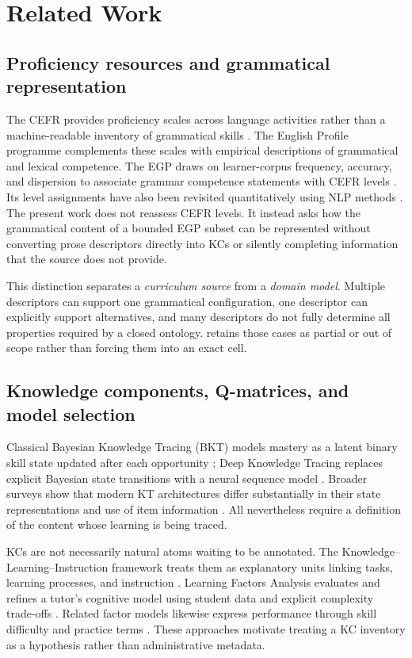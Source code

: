 \section{Related Work}

\subsection{Proficiency resources and grammatical representation}

The CEFR provides proficiency scales across language activities rather than a
machine-readable inventory of grammatical skills \citep{coe-2020-cefr}.  The
English Profile programme complements these scales with empirical descriptions
of grammatical and lexical competence.  The EGP draws on learner-corpus
frequency, accuracy, and dispersion to associate grammar competence statements
with CEFR levels \citep{okeeffe-mark-2017}.  Its level assignments have also
been revisited quantitatively using NLP methods
\citep{verratti-souto-etal-2025}.  The present work does not reassess CEFR
levels.  It instead asks how the grammatical content of a bounded EGP subset
can be represented without converting prose descriptors directly into KCs or
silently completing information that the source does not provide.

This distinction separates a \emph{curriculum source} from a \emph{domain
model}.  Multiple descriptors can support one grammatical configuration, one
descriptor can explicitly support alternatives, and many descriptors do not
fully determine all properties required by a closed ontology.  \system retains
those cases as partial or out of scope rather than forcing them into an exact
cell.

\subsection{Knowledge components, Q-matrices, and model selection}

Classical Bayesian Knowledge Tracing (BKT) models mastery as a latent binary
skill state updated after each opportunity \citep{corbett-anderson-1995}; Deep
Knowledge Tracing replaces explicit Bayesian state transitions with a neural
sequence model \citep{piech-etal-2015}.  Broader surveys show that modern KT
architectures differ substantially in their state representations and use of
item information \citep{abdelrahman-etal-2023}.  All nevertheless require a
definition of the content whose learning is being traced.

KCs are not necessarily natural atoms waiting to be annotated.  The
Knowledge--Learning--Instruction framework treats them as explanatory units
linking tasks, learning processes, and instruction \citep{koedinger-etal-2012}.
Learning Factors Analysis evaluates and refines a tutor's cognitive model using
student data and explicit complexity trade-offs \citep{cen-etal-2006}.  Related
factor models likewise express performance through skill difficulty and
practice terms \citep{pavlik-etal-2009}.  These approaches motivate treating a
KC inventory as a hypothesis rather than administrative metadata.

